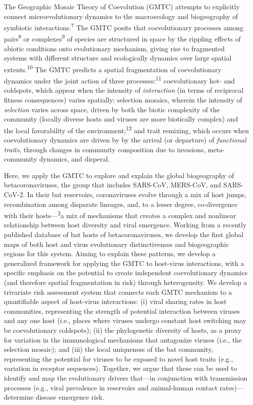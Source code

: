 \documentclass[11pt]{article}
\begin{document}
The Geographic Mosaic Theory of Coevolution (GMTC) attempts to
explicitly connect microevolutionary dynamics to the macroecology and
biogeography of symbiotic interactions.\textsuperscript{7} The GMTC
posits that coevolutionary processes among pairs\textsuperscript{8} or
complexes\textsuperscript{9} of species are structured in space by the
rippling effects of abiotic conditions onto evolutionary mechanism,
giving rise to fragmented systems with different structure and
ecologically dynamics over large spatial extents.\textsuperscript{10}
The GMTC predicts a spatial fragmentation of coevolutionary dynamics
under the joint action of three processes:\textsuperscript{11}
coevolutionary hot- and coldspots, which appear when the intensity of
\emph{interaction} (in terms of reciprocal fitness consequences) varies
spatially; selection mosaics, wherein the intensity of \emph{selection}
varies across space, driven by both the biotic complexity of the
community (locally diverse hosts and viruses are more biotically
complex) and the local favorability of the
environment;\textsuperscript{12} and trait remixing, which occurs when
coevolutionary dynamics are driven by by the arrival (or departure) of
\emph{functional traits}, through changes in community composition due
to invasions, meta-community dynamics, and disperal.

Here, we apply the GMTC to explore and explain the global biogeography
of betacoronaviruses, the group that includes SARS-CoV, MERS-CoV, and
SARS-CoV-2. In their bat reservoirs, coronaviruses evolve through a mix
of host jumps, recombination among disparate lineages, and, to a lesser
degree, co-divergence with their hosts---\textsuperscript{2}a mix of
mechanisms that creates a complex and nonlinear relationship between
host diversity and viral emergence. Working from a recently published
database of bat hosts of betacoronaviruses, we develop the first global
maps of both host and virus evolutionary distinctiveness and
biogeographic regions for this system. Aiming to explain these patterns,
we develop a generalized framework for applying the GMTC to host-virus
interactions, with a specific emphasis on the potential to create
independent coevolutionary dynamics (and therefore spatial fragmentation
in risk) through heterogeneity. We develop a trivariate risk assessment
system that connects each GMTC mechanism to a quantifiable aspect of
host-virus interactions: (i) viral sharing rates in host communities,
representing the strength of potential interaction between viruses and
any one host (i.e., places where viruses undergo constant host switching
may be coevolutionary coldspots); (ii) the phylogenetic diversity of
hosts, as a proxy for variation in the immunological mechanisms that
antagonize viruses (i.e., the selection mosaic); and (iii) the local
uniqueness of the bat community, representing the potential for viruses
to be exposed to novel host traits (e.g., variation in receptor
sequences). Together, we argue that these can be used to identify and
map the evolutionary drivers that---in conjunction with transmission
processes (e.g., viral prevalence in reservoirs and animal-human contact
rates)--- determine disease emergence risk.
\end{document}
